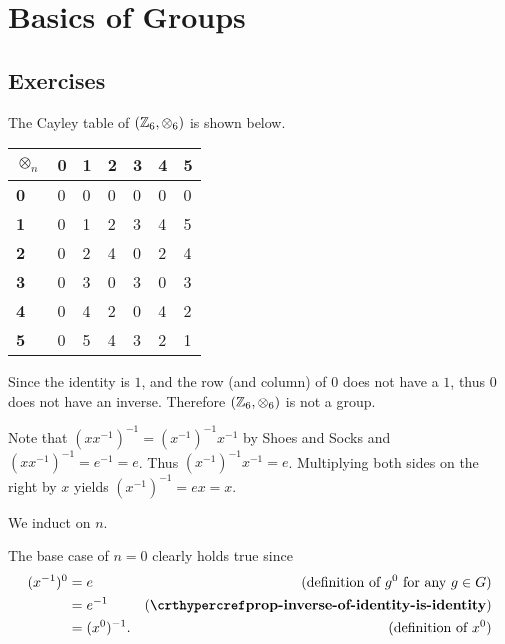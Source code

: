 \section{Basics of Groups}
\subsection*{Exercises}
\begin{questions}
    \item The Cayley table of $(\mathbb{Z}_6, \otimes_6)$ is shown below.
    \begin{table}[H]
        \centering
        \begin{tabular}{|l|l|l|l|l|l|l|}
        \hline
        \textbf{$\otimes_n$} & \textbf{0} & \textbf{1} & \textbf{2} & \textbf{3} & \textbf{4} & \textbf{5} \\ \hline
        \textbf{0} & 0 & 0 & 0 & 0 & 0 & 0 \\ \hline
        \textbf{1} & 0 & 1 & 2 & 3 & 4 & 5 \\ \hline
        \textbf{2} & 0 & 2 & 4 & 0 & 2 & 4 \\ \hline
        \textbf{3} & 0 & 3 & 0 & 3 & 0 & 3 \\ \hline
        \textbf{4} & 0 & 4 & 2 & 0 & 4 & 2 \\ \hline
        \textbf{5} & 0 & 5 & 4 & 3 & 2 & 1 \\ \hline
        \end{tabular}
    \end{table}

    Since the identity is $1$, and the row (and column) of 0 does not have a $1$, thus $0$ does not have an inverse. Therefore $(\mathbb{Z}_6, \otimes_6)$ is not a group.

    \item Note that $(xx^{-1})^{-1} = (x^{-1})^{-1}x^{-1}$ by Shoes and Socks and $(xx^{-1})^{-1} = e^{-1} = e$. Thus $(x^{-1})^{-1}x^{-1} = e$. Multiplying both sides on the right by $x$ yields $(x^{-1})^{-1} = ex = x$.

    \item We induct on $n$.

    The base case of $n = 0$ clearly holds true since
    \begin{align*}
        (x^{-1})^0 &= e & (\text{definition of }g^0 \text{ for any }g\in G)\\
        &= e^{-1} & (\myref{prop-inverse-of-identity-is-identity})\\
        &= (x^0)^{-1}. & (\text{definition of }x^0)
    \end{align*}


\end{questions}
